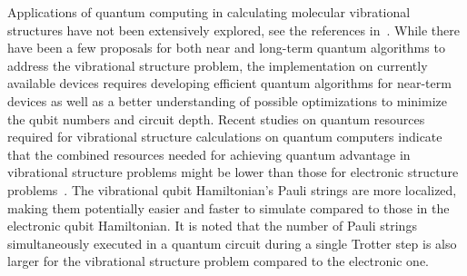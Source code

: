 Applications of quantum computing in calculating molecular vibrational structures have not been extensively explored, see the references in~\cite{QuantumAlgorithmsSrvey_AWS2023,VibResourceEstimate_IBM2023,2023arXiv230613126S}. While there have been a few proposals for both near and long-term quantum algorithms to address the vibrational structure problem, the implementation on currently available devices requires developing efficient quantum algorithms for near-term devices as well as a better understanding of possible optimizations to minimize the qubit numbers and circuit depth. Recent studies on quantum resources required for vibrational structure calculations on quantum computers indicate that the combined resources needed for achieving quantum advantage in vibrational structure problems might be lower than those for electronic structure problems~\cite{NSawaya2021,VibResourceEstimate_IBM2023}. The vibrational qubit Hamiltonian's Pauli strings are more localized, making them potentially easier and faster to simulate compared to those in the electronic qubit Hamiltonian. It is noted that the number of Pauli strings simultaneously executed in a quantum circuit during a single Trotter step is also larger for the vibrational structure problem compared to the electronic one. 

